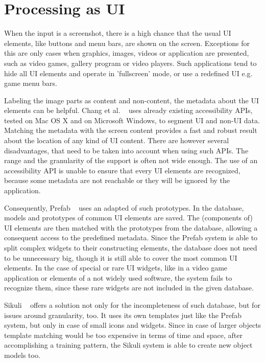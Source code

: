 \documentclass[draft,final]{vutinfth} %
\begin{document}
	\section{Processing as UI}
	When the input is a screenshot, there is a high chance that the usual UI elements, like buttons and menu bars, are shown on the screen.
	Exceptions for this are only cases when graphics, images, videos or application are presented, such as video games, gallery program or video players.
	Such applications tend to hide all UI elements and operate in 'fullscreen' mode, or use a redefined UI e.g. game menu bars.\par
	Labeling the image parts as content and non-content, the metadata about the UI elements can be helpful.
	Chang et al. ~\cite{chang2011associating} uses already existing accessibility APIs, tested on Mac OS X and on Microsoft Windows, to segment UI and non-UI data. 
	Matching the metadata with the screen content provides a fast and robust result about the location of any kind of UI content.
	There are however several disadvantages, that need to be taken into account when using such APIs.
	The range and the granularity of the support is often not wide enough.
	The use of an accessibility API is unable to ensure that every UI elements are recognized, because some metadata are not reachable or they will be ignored by the application.\par
	Consequently, Prefab ~\cite{dixon2010prefab} uses an adapted of such prototypes. 
	In the database, models and  prototypes of common UI elements are saved.
	The (components of) UI elements are then matched with the prototypes from the database, allowing a consequent access to the predefined metadata.
	Since the Prefab system is able to split complex widgets to their constructing elements, the database does not need to be unnecessary big, though it is still able to cover the most common UI elements.
	In the case of special or rare UI widgets, like in a video game application or elements of a not widely used software, the system fails to recognize them, since these rare widgets are not included in the given database.\par
	Sikuli ~\cite{yeh2009sikuli} offers a solution not only for the incompleteness of such database, but for issues around granularity, too.
	It uses its own templates just like the Prefab system, but only in case of small icons and widgets.
	Since in case of larger objects template matching would be too expensive in terms of time and space, after accomplishing a training pattern, the Sikuli system is able to create new object models too.
\end{document}
